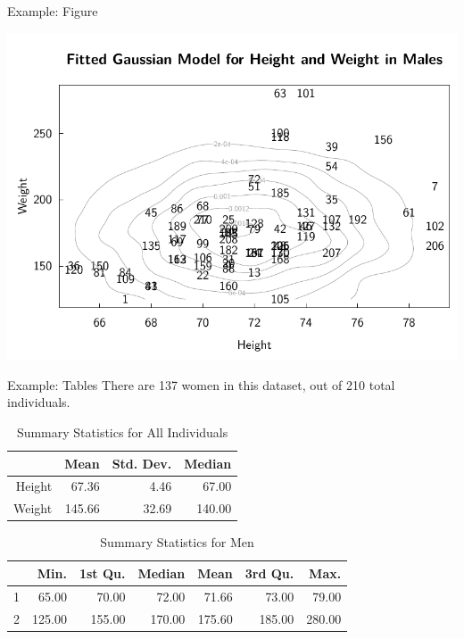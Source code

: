 \documentclass{beamer}\usepackage[]{graphicx}\usepackage[]{color}
\newenvironment{knitrout}{}{} %
\begin{document}
	\begin{frame}{Example: Figure}
\begin{knitrout}
\color{fgcolor}

{\centering \includegraphics[width=.7\textwidth]{figure/exampleplot-1} 

}



\end{knitrout}
	\end{frame}
	
	\begin{frame}{Example: Tables}
	There are 137 women in this dataset, out of 210 total individuals.
\begin{table}[ht]
\centering
\begin{tabular}{rrrr}
  \hline
 & Mean & Std. Dev. & Median \\ 
  \hline
Height & 67.36 & 4.46 & 67.00 \\ 
  Weight & 145.66 & 32.69 & 140.00 \\ 
   \hline
\end{tabular}
\caption{Summary Statistics for All Individuals} 
\end{table}
\begin{table}[ht]
\centering
\begin{tabular}{rrrrrrr}
  \hline
 & Min. & 1st Qu. & Median & Mean & 3rd Qu. & Max. \\ 
  \hline
1 & 65.00 & 70.00 & 72.00 & 71.66 & 73.00 & 79.00 \\ 
  2 & 125.00 & 155.00 & 170.00 & 175.60 & 185.00 & 280.00 \\ 
   \hline
\end{tabular}
\caption{Summary Statistics for Men} 
\end{table}

	\end{frame}
\end{document}
